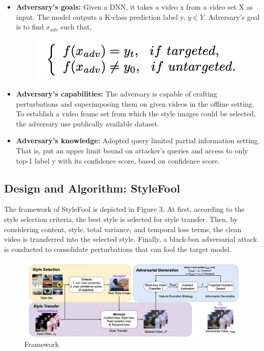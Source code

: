 \begin{itemize}
    \item \textbf{Adversary's goals: } Given a DNN, it takes a video x from a video set X as input. The model outputs a K-class prediction label y, $y \in Y$. Adversary's goal is to find $x_{adv} $ such that, 
    \begin{figure}[!hbt]
    \centering
    \includegraphics[scale=0.4]{img/goals.png}
    \end{figure}
    \item \textbf{Adversary's capabilities: } The adversary is capable of crafting perturbations and superimposing them on given videos in the offline setting. To establish a video frame set from which the style images could be selected, the adversary use publically available dataset.
    \item \textbf{Adversary's knowledge: } Adopted  query limited partial information setting. That is, put an upper limit bound on attacker's queries and access to only top-1 label y with its confidence score, based on confidence score.
\end{itemize}

\subsection{Design and Algorithm: StyleFool}
The framework of StyleFool is depicted in Figure 3. At first, according to the style selection criteria, the best style is selected for style transfer. Then, by considering content, style, total variance, and temporal loss terms, the clean video is transferred into the selected style. Finally, a black-box adversarial attack is conducted to consolidate perturbations that can fool the target model.
\begin{figure}[!hbt]
    \centering
    \includegraphics[scale=0.28]{img/framework.png}
    \caption{Framework}
    \label{fig:Figure3}
\end{figure}

